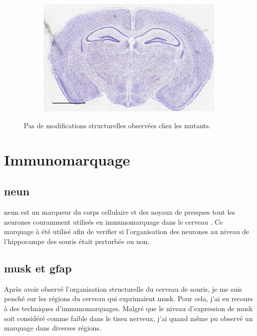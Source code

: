 \begin{figure}[h]
\begin{center}
\begin{subfigure}[h]{0.49\textwidth}
		\end{subfigure}
		\begin{subfigure}[h]{0.49\textwidth}%
			\caption{}
			\label{fig:MaleMutNissl}
			\includegraphics[width=\textwidth]{./Images/Nissl/MaleMut.jpg}
		\end{subfigure}
	\end{center}
	\caption{Pas de modifications structurelles observées chez les mutants.}
	\label{fig:NisslResultat}
\end{figure}

\section{Immunomarquage}
\label{sec:IHC}

\subsection{\acrshort{neun}}
\label{ssec:neun}
\Acrshort{neun} est un marqueur du  corps cellulaire et des noyaux de presques tout les neurones couramment utilisés en immunomarquage dans le cerveau \cite{Guselnikova2015}. Ce marquage à été utilisé afin de verifier si l'organisation des neurones au niveau de l'hippocampe des souris \mcrd était perturbée ou non.

\subsection{\acrshort{musk} et \acrshort{gfap}}
\label{ssec:musk}
Après avoir observé l'organisation structurelle du cerveau de souris, je me suis penché sur les régions du cerveau qui exprimaient \gls{musk}. Pour cela, j'ai eu recours à des techniques d'immunomarquages. Malgré que le niveau d'expression de \gls{musk} soit considéré comme faible dans le tissu nerveux, j'ai quand même pu observé un marquage dans diverses régions.

